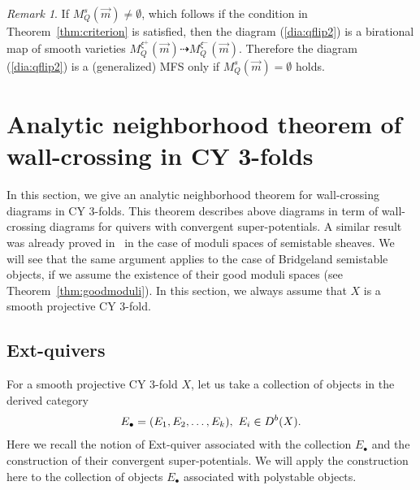 \documentclass[11pt]{amsart}
\theoremstyle{plain}
\theoremstyle{definition}
\theoremstyle{remark}
\newtheorem{rmk}[thm]{Remark}
\begin{document}
\begin{rmk}\label{rmk:MFS:quiver}
If 
$M_Q^s(\vec{m}) \neq \emptyset$, 
which follows if the condition in Theorem~\ref{thm:criterion}
is satisfied, then the diagram (\ref{dia:qflip2})
is a birational map of smooth varieties
$M_Q^{\xi^+}(\vec{m}) \dashrightarrow 
M_Q^{\xi^-}(\vec{m})$. 
Therefore the diagram (\ref{dia:qflip2}) is 
a (generalized) MFS only if 
$M_Q^{s}(\vec{m}) = \emptyset$ holds. 
\end{rmk}







\section{Analytic neighborhood theorem of wall-crossing in CY 3-folds}
\label{sec:anatheorem}
In this section, 
we give an analytic neighborhood theorem
for wall-crossing diagrams in CY 3-folds. 
This theorem describes 
above diagrams 
in term of wall-crossing diagrams for 
quivers with convergent super-potentials. 
A similar result was already proved in~\cite{Todstack} 
in the case of moduli spaces of semistable sheaves.
We will see that 
the same argument applies 
to the case of Bridgeland semistable objects, 
if we assume the existence of their
good moduli spaces (see Theorem~\ref{thm:goodmoduli}). 
In this section, we always assume that 
$X$ is a smooth projective CY 3-fold. 


\subsection{Ext-quivers}\label{subsec:Ext}
For a smooth projective CY 3-fold $X$, 
let us take a collection of objects in the 
derived category
\begin{align}\notag
E_{\bullet}=(E_1, E_2, \ldots, E_k), \ 
E_i \in D^b(X). 
\end{align}
Here we recall the 
notion of Ext-quiver associated with the 
collection $E_{\bullet}$
and the 
construction of their
convergent super-potentials. 
We will apply the construction here to 
the collection of objects $E_{\bullet}$
associated with polystable objects. 
\end{document}
